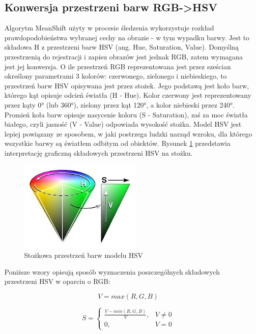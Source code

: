 \subsection{Konwersja przestrzeni barw RGB->HSV}
\label{fig:HSV_cone}
Algorytm MeanShift użyty w procesie śledzenia wykorzystuje rozkład prawdopodobieństwa wybranej cechy na obrazie - w tym wypadku barwy. Jest to składowa H z przestrzeni barw HSV (ang. Hue, Saturation, Value). Domyślną przestrzenią do rejestracji i zapisu obrazów jest jednak RGB, zatem wymagana jest jej konwersja. O ile przestrzeń RGB reprezentowana jest przez sześcian określony parametrami 3 kolorów: czerwonego, zielonego i niebieskiego, to przestrzeń barw HSV opisywana jest przez stożek. Jego podstawą jest koło barw, którego kąt opisuje odcień światła (H - Hue). Kolor czerwony jest reprezentowany przez kąty 0\si{\degree} (lub 360\si{\degree}), zielony przez kąt 120\si{\degree}, a kolor niebieski przez 240\si{\degree}. Promień koła barw opisuje nasycenie koloru (S - Saturation), zaś za moc światła białego, czyli jasność (V - Value) odpowiada wysokość stożka. Model HSV jest lepiej powiązany ze sposobem, w jaki postrzega ludzki narząd wzroku, dla którego wszystkie barwy są światłem odbitym od obiektów. Rysunek \ref{fig:HSV_cone} przedstawia interpretację graficzną składowych przestrzeni HSV na stożku.

\begin{figure}[h]
	\centering
	\includegraphics[width=6cm]{3_HSV.jpg}
	\caption{Stożkowa przestrzeń barw modelu HSV}
	\label{fig:HSV_cone}
\end{figure}

Poniższe wzory opisują sposób wyznaczenia poszczególnych składowych przestrzeni HSV w oparciu o RGB:

\begin{equation}
\label{HSV_first}
V=max(R,G,B)
\end{equation}

\begin{equation}
S=\begin{cases}
\frac{V-min(R,G,B)}{V}, & V\neq0 \\
0, & V=0
\end{cases}
\end{equation}

